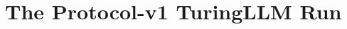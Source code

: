 \documentclass[10pt]{article}
\begin{document}
\FloatBarrier
{}

\def\frameworkpart{history}

\FloatBarrier
\section{The Protocol-v1 TuringLLM Run}
\label{app:v1-run}
\end{document}
